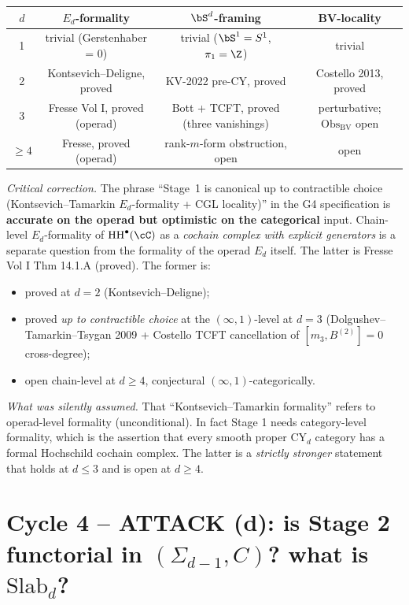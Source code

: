 \documentclass[11pt]{article}
\theoremstyle{definition}
\providecommand{\HH}{\mathrm{HH}}
\begin{document}
\smallskip
\begin{center}
\begin{tabular}{|c|c|c|c|}
\hline
$d$ & $E_d$-formality & $\bS^d$-framing & BV-locality \\
\hline
1 & trivial (Gerstenhaber = 0) & trivial ($\bS^1 = S^1$, $\pi_1 = \Z$) & trivial \\
2 & Kontsevich--Deligne, proved & KV-2022 pre-CY, proved & Costello 2013, proved \\
3 & Fresse Vol I, proved (operad) & Bott + TCFT, proved (three vanishings) & perturbative; $\mathrm{Obs}_{\mathrm{BV}}$ open \\
$\geq 4$ & Fresse, proved (operad) & rank-$m$-form obstruction, open & open \\
\hline
\end{tabular}
\end{center}

\smallskip
\emph{Critical correction.} The phrase ``Stage~1 is canonical up to
contractible choice (Kontsevich--Tamarkin $E_d$-formality + CGL
locality)'' in the G4 specification is
\textbf{accurate on the operad but optimistic on the categorical}
input. Chain-level $E_d$-formality of
$\HH^\bullet(\cC)$ as a \emph{cochain complex with explicit
generators} is a separate question from the formality of the operad
$E_d$ itself. The latter is Fresse Vol I Thm 14.1.A (proved). The
former is:

\begin{itemize}[leftmargin=*]
\item proved at $d = 2$ (Kontsevich--Deligne);
\item proved \emph{up to contractible choice} at the $(\infty,1)$-level at
$d = 3$ (Dolgushev--Tamarkin--Tsygan 2009 + Costello TCFT cancellation
of $[m_3, B^{(2)}] = 0$ cross-degree);
\item open chain-level at $d \geq 4$, conjectural
$(\infty,1)$-categorically.
\end{itemize}

\emph{What was silently assumed.} That ``Kontsevich--Tamarkin
formality'' refers to operad-level formality (unconditional). In fact
Stage 1 needs category-level formality, which is the assertion that
every smooth proper CY$_d$ category has a formal Hochschild cochain
complex. The latter is a \emph{strictly stronger} statement that holds
at $d \leq 3$ and is open at $d \geq 4$.

\section*{Cycle 4 -- ATTACK (d): is Stage 2 functorial in $(\Sigma_{d-1}, C)$?
what is $\mathrm{Slab}_d$?}
\end{document}
